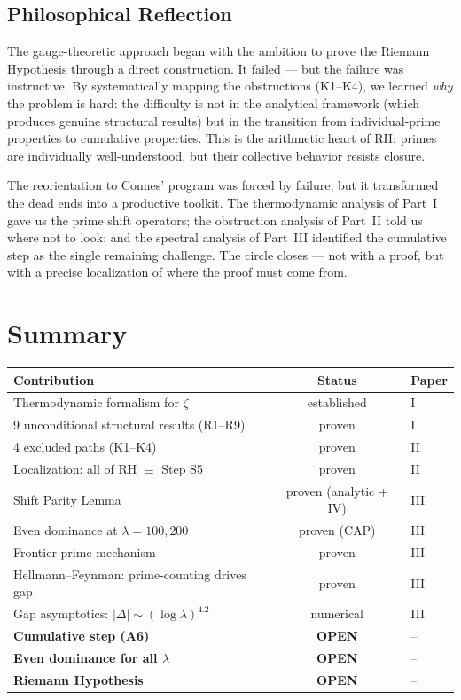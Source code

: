 \documentclass[12pt,a4paper]{article}
\theoremstyle{definition}
\theoremstyle{remark}
\begin{document}
\subsection{Philosophical Reflection}

The gauge-theoretic approach began with the ambition to prove the Riemann Hypothesis through a direct construction. It failed --- but the failure was instructive. By systematically mapping the obstructions (K1--K4), we learned \emph{why} the problem is hard: the difficulty is not in the analytical framework (which produces genuine structural results) but in the transition from individual-prime properties to cumulative properties. This is the arithmetic heart of RH: primes are individually well-understood, but their collective behavior resists closure.

The reorientation to Connes' program was forced by failure, but it transformed the dead ends into a productive toolkit. The thermodynamic analysis of Part~I gave us the prime shift operators; the obstruction analysis of Part~II told us where not to look; and the spectral analysis of Part~III identified the cumulative step as the single remaining challenge. The circle closes --- not with a proof, but with a precise localization of where the proof must come from.


\section{Summary}
\label{sec:summary}

\begin{center}
\renewcommand{\arraystretch}{1.3}
\begin{tabular}{l|c|l}
\textbf{Contribution} & \textbf{Status} & \textbf{Paper} \\\hline
Thermodynamic formalism for $\zeta$ & established & I \\
9 unconditional structural results (R1--R9) & proven & I \\
4 excluded paths (K1--K4) & proven & II \\
Localization: all of RH $\equiv$ Step S5 & proven & II \\
Shift Parity Lemma & proven (analytic + IV) & III \\
Even dominance at $\lambda = 100, 200$ & proven (CAP) & III \\
Frontier-prime mechanism & proven & III \\
Hellmann--Feynman: prime-counting drives gap & proven & III \\
Gap asymptotics: $|\Delta| \sim (\log\lambda)^{4.2}$ & numerical & III \\
\textbf{Cumulative step (A6)} & \textbf{OPEN} & -- \\
\textbf{Even dominance for all $\lambda$} & \textbf{OPEN} & -- \\
\textbf{Riemann Hypothesis} & \textbf{OPEN} & --
\end{tabular}
\end{center}
\end{document}
